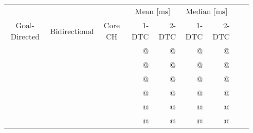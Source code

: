 \begin{tabular}{cccrrrrrr}
	\toprule
	              &               &         & \multicolumn{2}{c}{Mean [\si{\milli\second}]} & \multicolumn{2}{c}{Median [\si{\milli\second}]}                 \\
	Goal-Directed & Bidirectional & Core CH & 1-DTC                                       & 2-DTC                                         & 1-DTC & 2-DTC \\
	\midrule
	\xmark        & \xmark        & \xmark  & @                                           & @                                             & @     & @     \\
	\cmark        & \xmark        & \xmark  & @                                           & @                                             & @     & @     \\
	\xmark        & \cmark        & \xmark  & @                                           & @                                             & @     & @     \\
	\cmark        & \cmark        & \xmark  & @                                           & @                                             & @     & @     \\
	\xmark        & \cmark        & \cmark  & @                                           & @                                             & @     & @     \\
	\cmark        & \cmark        & \cmark  & @                                           & @                                             & @     & @     \\
	\bottomrule
\end{tabular}